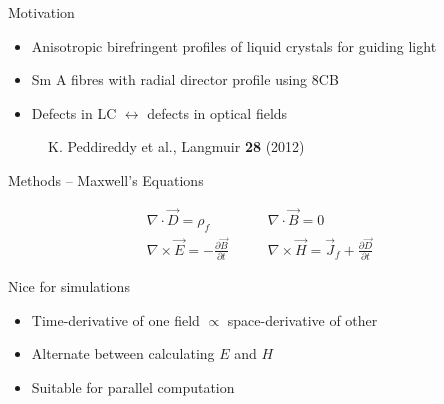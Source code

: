 \documentclass{beamer}
\newlength{\wideitemsep}
\let\olditem\item
\renewcommand{\item}{\setlength{\itemsep}{\wideitemsep}\olditem}
\newcommand{\odvod}[2]{\frac{\partial #1}{\partial #2}}
\begin{document}
\begin{frame}{Motivation}

\begin{block}{}
\begin{itemize}
  \item Anisotropic birefringent profiles of liquid crystals for guiding light
  \item Sm A fibres with radial director profile using 8CB
  \item Defects in LC $\leftrightarrow$ defects in optical fields
\end{itemize}
\end{block}

\begin{block}{}
  \vspace{-25pt}
  \begin{figure}[h]
     \qquad
    \vspace{-5pt}
    \caption{K. Peddireddy et al., Langmuir \textbf{28} (2012)}
  \end{figure}
  \vspace{-15pt}
\end{block}


\end{frame}

\begin{frame}{Methods -- Maxwell's Equations}
\begin{block}{}
  \vspace{-25pt}
  \begin{align*}
     \nabla \cdot \vec D = \rho_f & \qquad \nabla \cdot \vec B = 0 \\
     \nabla \times \vec E = -\odvod{\vec B}{t} & \qquad \nabla \times \vec H = \vec J_f + \odvod{\vec D}{t}
  \end{align*}
\end{block}
\begin{block}{Nice for simulations}
  \begin{itemize}
    \item Time-derivative of one field $\propto$ space-derivative of other
    \item Alternate between calculating $E$ and $H$
    \item Suitable for parallel computation
  \end{itemize}
\end{block}
\end{frame}
\end{document}
